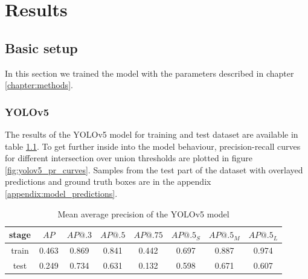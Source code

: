 \chapter{Results}
\label{chapter:results}

\section{Basic setup}
In this section we trained the model with the parameters described in chapter \ref{chapter:methods}.
\subsection{YOLOv5}
The results of the YOLOv5 model for training and test dataset are available in table \ref{tab:yolov5_basic}. To get further inside into the model behaviour, precision-recall curves for different intersection over union thresholds are plotted in figure \ref{fig:yolov5_pr_curves}. Samples from the test part of the dataset with overlayed predictions and ground truth boxes are in the appendix \ref{appendix:model_predictions}.
\begin{table}
    \begin{tabular}{c|c|c|c|c|c|c|c}
        stage & $AP$  & $AP@.3$ & $AP@.5$ & $AP@.75$ & $AP@.5_S$ & $AP@.5_M$ & $AP@.5_L$ \\ \hline
        train & 0.463 & 0.869   & 0.841   & 0.442    & 0.697     & 0.887     & 0.974     \\ \hline
        test  & 0.249 & 0.734   & 0.631   & 0.132    & 0.598     & 0.671     & 0.607     \\
    \end{tabular}
    \caption{Mean average precision of the YOLOv5 model}
    \label{tab:yolov5_basic}
\end{table}

